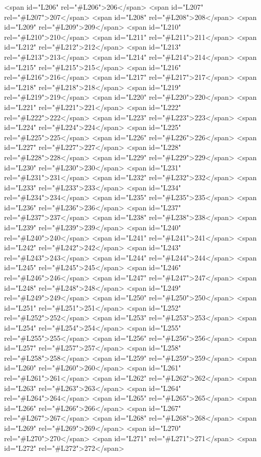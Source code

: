 <span id="L206" rel="#L206">206</span>
<span id="L207" rel="#L207">207</span>
<span id="L208" rel="#L208">208</span>
<span id="L209" rel="#L209">209</span>
<span id="L210" rel="#L210">210</span>
<span id="L211" rel="#L211">211</span>
<span id="L212" rel="#L212">212</span>
<span id="L213" rel="#L213">213</span>
<span id="L214" rel="#L214">214</span>
<span id="L215" rel="#L215">215</span>
<span id="L216" rel="#L216">216</span>
<span id="L217" rel="#L217">217</span>
<span id="L218" rel="#L218">218</span>
<span id="L219" rel="#L219">219</span>
<span id="L220" rel="#L220">220</span>
<span id="L221" rel="#L221">221</span>
<span id="L222" rel="#L222">222</span>
<span id="L223" rel="#L223">223</span>
<span id="L224" rel="#L224">224</span>
<span id="L225" rel="#L225">225</span>
<span id="L226" rel="#L226">226</span>
<span id="L227" rel="#L227">227</span>
<span id="L228" rel="#L228">228</span>
<span id="L229" rel="#L229">229</span>
<span id="L230" rel="#L230">230</span>
<span id="L231" rel="#L231">231</span>
<span id="L232" rel="#L232">232</span>
<span id="L233" rel="#L233">233</span>
<span id="L234" rel="#L234">234</span>
<span id="L235" rel="#L235">235</span>
<span id="L236" rel="#L236">236</span>
<span id="L237" rel="#L237">237</span>
<span id="L238" rel="#L238">238</span>
<span id="L239" rel="#L239">239</span>
<span id="L240" rel="#L240">240</span>
<span id="L241" rel="#L241">241</span>
<span id="L242" rel="#L242">242</span>
<span id="L243" rel="#L243">243</span>
<span id="L244" rel="#L244">244</span>
<span id="L245" rel="#L245">245</span>
<span id="L246" rel="#L246">246</span>
<span id="L247" rel="#L247">247</span>
<span id="L248" rel="#L248">248</span>
<span id="L249" rel="#L249">249</span>
<span id="L250" rel="#L250">250</span>
<span id="L251" rel="#L251">251</span>
<span id="L252" rel="#L252">252</span>
<span id="L253" rel="#L253">253</span>
<span id="L254" rel="#L254">254</span>
<span id="L255" rel="#L255">255</span>
<span id="L256" rel="#L256">256</span>
<span id="L257" rel="#L257">257</span>
<span id="L258" rel="#L258">258</span>
<span id="L259" rel="#L259">259</span>
<span id="L260" rel="#L260">260</span>
<span id="L261" rel="#L261">261</span>
<span id="L262" rel="#L262">262</span>
<span id="L263" rel="#L263">263</span>
<span id="L264" rel="#L264">264</span>
<span id="L265" rel="#L265">265</span>
<span id="L266" rel="#L266">266</span>
<span id="L267" rel="#L267">267</span>
<span id="L268" rel="#L268">268</span>
<span id="L269" rel="#L269">269</span>
<span id="L270" rel="#L270">270</span>
<span id="L271" rel="#L271">271</span>
<span id="L272" rel="#L272">272</span>
